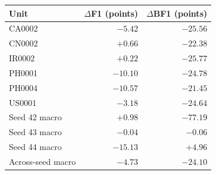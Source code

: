 \small
\begin{tabular}{lrr}
\toprule
Unit & $\Delta$F1 (points) & $\Delta$BF1 (points) \\
\midrule
CA0002 & $-5.42$ & $-25.56$ \\
CN0002 & $+0.66$ & $-22.38$ \\
IR0002 & $+0.22$ & $-25.77$ \\
PH0001 & $-10.10$ & $-24.78$ \\
PH0004 & $-10.57$ & $-21.45$ \\
US0001 & $-3.18$ & $-24.64$ \\
\midrule
Seed 42 macro & $+0.98$ & $-77.19$ \\
Seed 43 macro & $-0.04$ & $-0.06$ \\
Seed 44 macro & $-15.13$ & $+4.96$ \\
\midrule
Across-seed macro & $-4.73$ & $-24.10$ \\
\bottomrule
\end{tabular}
